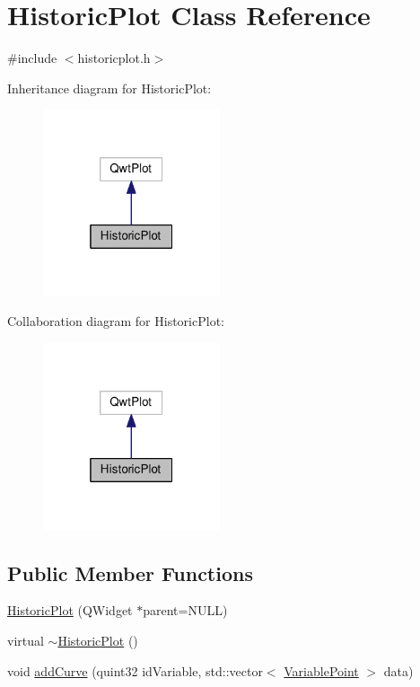 \hypertarget{class_historic_plot}{}\section{Historic\+Plot Class Reference}
\label{class_historic_plot}


{\ttfamily \#include $<$historicplot.\+h$>$}



Inheritance diagram for Historic\+Plot\+:
\nopagebreak
\begin{figure}[H]
\begin{center}
\leavevmode
\includegraphics[width=148pt]{class_historic_plot__inherit__graph}
\end{center}
\end{figure}


Collaboration diagram for Historic\+Plot\+:
\nopagebreak
\begin{figure}[H]
\begin{center}
\leavevmode
\includegraphics[width=148pt]{class_historic_plot__coll__graph}
\end{center}
\end{figure}
\subsection*{Public Member Functions}
\begin{DoxyCompactItemize}
\item 
\hyperlink{class_historic_plot_af53e7ba61f7149e3a636e68947e9a7a2}{Historic\+Plot} (Q\+Widget $\ast$parent=N\+U\+L\+L)
\item 
virtual \hyperlink{class_historic_plot_aed53d3311a40d054be95b6f197e00bfb}{$\sim$\+Historic\+Plot} ()
\item 
void \hyperlink{class_historic_plot_ae49fb8bd7fe568a99fd0983ed0f611c1}{add\+Curve} (quint32 id\+Variable, std\+::vector$<$ \hyperlink{class_variable_point}{Variable\+Point} $>$ data)
\end{DoxyCompactItemize}


